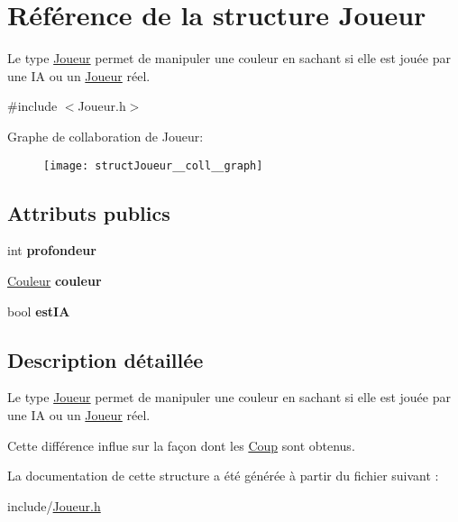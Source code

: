 \hypertarget{structJoueur}{}\section{Référence de la structure Joueur}
\label{structJoueur}


Le type \hyperlink{structJoueur}{Joueur} permet de manipuler une couleur en sachant si elle est jouée par une IA ou un \hyperlink{structJoueur}{Joueur} réel.  




{\ttfamily \#include $<$Joueur.\+h$>$}



Graphe de collaboration de Joueur\+:
\nopagebreak
\begin{figure}[H]
\begin{center}
\leavevmode
\texttt{[image: structJoueur\_\_coll\_\_graph]}
\end{center}
\end{figure}
\subsection*{Attributs publics}
\begin{DoxyCompactItemize}
\item 
\mbox{\label{structJoueur_a6abd80423308269aa3610b2e1a53f9cd}} 
int {\bfseries profondeur}
\item 
\mbox{\label{structJoueur_a966bbda4413e0b0d7aaf109660926639}} 
\hyperlink{structCouleur}{Couleur} {\bfseries couleur}
\item 
\mbox{\label{structJoueur_a229ed51bc4fd671d8657abbd26ae980f}} 
bool {\bfseries est\+IA}
\end{DoxyCompactItemize}


\subsection{Description détaillée}
Le type \hyperlink{structJoueur}{Joueur} permet de manipuler une couleur en sachant si elle est jouée par une IA ou un \hyperlink{structJoueur}{Joueur} réel. 

Cette différence influe sur la façon dont les \hyperlink{structCoup}{Coup} sont obtenus. 

La documentation de cette structure a été générée à partir du fichier suivant \+:\begin{DoxyCompactItemize}
\item 
include/\hyperlink{Joueur_8h}{Joueur.\+h}\end{DoxyCompactItemize}
